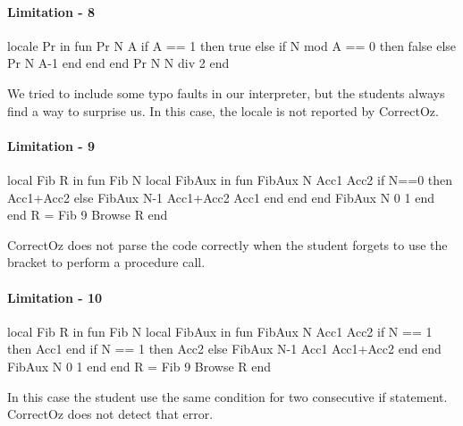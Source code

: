 \documentclass[11pt,a4paper,twoside,openright]{report}
\begin{document}
\paragraph{Limitation - 8}

\begin{OZ}
locale Pr in
	fun {Pr N A}
		 if A == 1 then true
		 else
			if N mod A == 0 then false
			else
			   {Pr N A-1}
			end
		 end
	 end
	 {Pr N N div 2}
end

\end{OZ}

We tried to include some typo faults in our interpreter, but the students 
always 
find a way to surprise us. In this case, the locale is not reported by CorrectOz.
 
 \paragraph{Limitation - 9}
 
 \begin{OZ}
 local Fib R in
    fun {Fib N}
        local FibAux in
            fun {FibAux N Acc1 Acc2}
				 if N==0 then Acc1+Acc2
				else FibAux N-1 Acc1+Acc2 Acc1 end
				   end
            end
            {FibAux N 0 1}
    	end
    end
    R = {Fib 9}
	{Browse R}
end

        \end{OZ}
        
        CorrectOz does not parse the code correctly when the student forgets to 
use 
        the bracket to perform a procedure call.
        

\paragraph{Limitation - 10}


\begin{OZ}
 local Fib R in
    fun {Fib N}
        local FibAux in
            fun {FibAux N Acc1 Acc2}
			if N == 1 then Acc1 end
			if N == 1 then Acc2
			else	{FibAux N-1 Acc1 Acc1+Acc2}        
			end
            end
            {FibAux N 0 1}
    	end
    end
    R = {Fib 9}
	{Browse R}
end
\end{OZ}

In this case the student use the same condition for two consecutive if 
statement. 
CorrectOz does not detect that error. 


%
%
%
\end{document}
